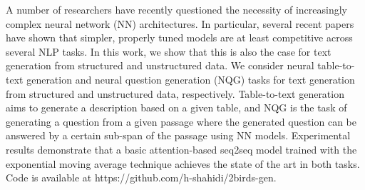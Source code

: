A number of researchers have recently questioned the necessity of increasingly complex neural network (NN) architectures. In particular, several recent papers have shown that simpler, properly tuned models are at least competitive across several NLP tasks. In this work, we show that this is also the case for text generation from structured and unstructured data. We consider neural table-to-text generation and neural question generation (NQG) tasks for text generation from structured and unstructured data, respectively. Table-to-text generation aims to generate a description based on a given table, and NQG is the task of generating a question from a given passage where the generated question can be answered by a certain sub-span of the passage using NN models. Experimental results demonstrate that a basic attention-based seq2seq model trained with the exponential moving average technique achieves the state of the art in both tasks. Code is available at https://github.com/h-shahidi/2birds-gen.

